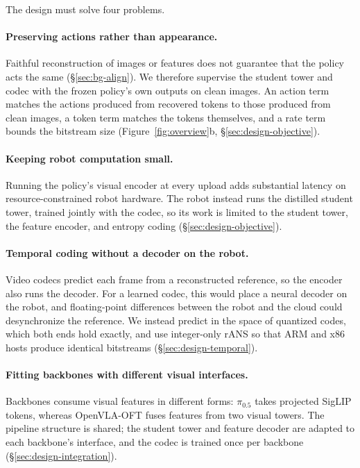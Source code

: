 \documentclass[sigconf,10pt]{acmart}
\begin{document}
The design must solve four problems.

\paragraph{Preserving actions rather than appearance.}
Faithful reconstruction of images or features does not guarantee that the
policy acts the same (\S\ref{sec:bg-align}). We therefore supervise the
student tower and codec with the frozen policy's own outputs on clean
images. An action term matches the actions produced from recovered tokens
to those produced from clean images, a token term matches the tokens
themselves, and a rate term bounds the bitstream size
(Figure~\ref{fig:overview}b, \S\ref{sec:design-objective}).

\paragraph{Keeping robot computation small.}
Running the policy's visual encoder at every upload adds substantial
latency on resource-constrained robot hardware. The robot instead runs the
distilled student tower, trained jointly with the codec, so its work is
limited to the student tower, the feature encoder, and entropy coding
(\S\ref{sec:design-objective}).

\paragraph{Temporal coding without a decoder on the robot.}
Video codecs predict each frame from a reconstructed reference, so the
encoder also runs the decoder. For a learned codec, this would place a
neural decoder on the robot, and floating-point differences between the
robot and the cloud could desynchronize the reference. We instead predict
in the space of quantized codes, which both ends hold exactly, and use
integer-only rANS so that ARM and x86 hosts produce identical bitstreams
(\S\ref{sec:design-temporal}).

\paragraph{Fitting backbones with different visual interfaces.}
Backbones consume visual features in different forms: $\pi_{0.5}$ takes
projected SigLIP tokens, whereas OpenVLA-OFT fuses features from two
visual towers. The pipeline structure is shared; the student tower and
feature decoder are adapted to each backbone's interface, and the codec is
trained once per backbone (\S\ref{sec:design-integration}).
\end{document}
